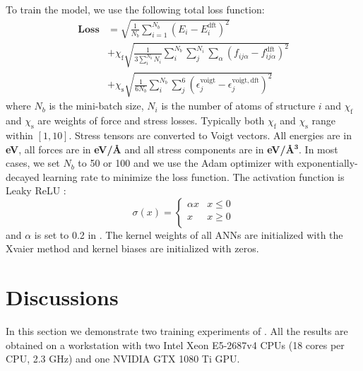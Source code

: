 \documentclass[prb,preprint]{revtex4-2}
\begin{document}
To train the model, we use the following total loss function:
\begin{align}
\label{eq:loss}
\mathbf{Loss} & = \sqrt{\frac{1}{N_{b}}\sum_{i=1}^{N_{b}}{\left(
    E_{i} - E_{i}^{\mathrm{dft}}
\right)^2}} \nonumber \\
& + \chi_{\mathrm{f}}\sqrt{
    \frac{1}{3\sum_{i}^{N_{b}}{N_i}}\sum_{i}^{N_b}{\sum_{j}^{N_i}{
        \sum_{\alpha}{
            \left(f_{ij\alpha} - f_{ij\alpha}^{\mathrm{dft}}\right)^2
        }
    }}
} \nonumber \\
& + \chi_{\mathrm{s}}\sqrt{\frac{1}{6N_b}\sum_{i}^{N_b}{
    \sum_{j}^{6}{
        \left(
            \epsilon^{\mathrm{voigt}}_{j} - \epsilon^{\mathrm{voigt,dft}}_{j}
        \right)^2
    }
}}
\end{align}
where $N_b$ is the mini-batch size, $N_i$ is the number of atoms of structure 
$i$ and $\chi_{\mathrm{f}}$ and $\chi_{\mathrm{s}}$ are weights of force and 
stress losses. Typically both $\chi_{\mathrm{f}}$ and $\chi_{\mathrm{s}}$ range 
within $[1,10]$. Stress tensors are converted to Voigt vectors. All energies are 
in \textbf{eV}, all forces are in \textbf{eV/\AA} and all stress components are 
in \textbf{eV/\AA}$\mathbf{^3}$. In most cases, we set $N_b$ to 50 or 100 and we
use the Adam\cite{adam} optimizer with exponentially-decayed learning rate to 
minimize the loss function. The activation function is Leaky ReLU
\cite{maas2013rectifier}:
\begin{equation}
\sigma(x) = \begin{cases}
    \alpha x & x \le 0 \\
    x & x \ge 0 \\
\end{cases}
\end{equation}
and $\alpha$ is set to 0.2 in \tensoralloy{}. The kernel weights of all ANNs are 
initialized with the Xvaier\cite{pmlr-v9-glorot10a} method and kernel biases are 
initialized with zeros.

% 
%
\section{Discussions}
\label{section:discussions}

In this section we demonstrate two training experiments of \tensoralloy{}. All 
the results are obtained on a workstation with two Intel Xeon E5-2687v4 CPUs 
(18 cores per CPU, 2.3 GHz) and one NVIDIA GTX 1080 Ti GPU.
\end{document}
